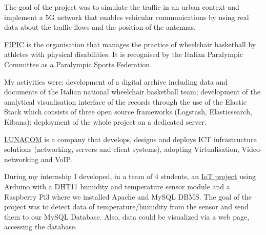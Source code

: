 \documentclass[10pt,a4paper]{altacv}
\begin{document}
The goal of the project was to simulate the traffic in an urban context and implement a 5G network that enables vehicular communications by using real data about the traffic flows and the position of the antennas.


\medskip
\medskip

\href{https://www.federipic.it/}{FIPIC} is the organisation that manages the practice of wheelchair basketball by athletes with physical disabilities. It is recognised by the Italian Paralympic Committee as a Paralympic Sports Federation.

My activities were: development of a digital archive including data and documents of the Italian national wheelchair basketball team; development of the analytical visualisation interface of the records through the use of the Elastic Stack which consists of three open source frameworks (Logstash, Elasticsearch, Kibana); deployment of the whole project on a dedicated server.

\medskip
\medskip

\href{https://www.lunacom.net/}{LUNACOM} is a company that develops, designs and deploys ICT infrastructure solutions (networking, servers and client systems), adopting Virtualisation, Video-networking and VoIP.

During my internship I developed, in a team of 4 students, an \href{https://mondoiot.wordpress.com/2017/06/28/progetto-iot-node-red-rabbitmq-mysql-phpmyadmin-esp8266/}{IoT project} using Arduino with a DHT11 humidity and temperature sensor module and a Raspberry Pi3 where we installed Apache and MySQL DBMS. The goal of the project was to detect data of temperature/humidity from the sensor and send them to our MySQL Database. Also, data could be visualized via a web page, accessing the database.

\medskip
\medskip
\end{document}
